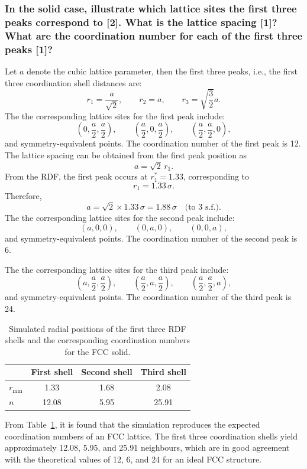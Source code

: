 \documentclass[a4paper,10pt,twocolumn]{article}
\begin{document}
\subsubsection*{In the solid case, illustrate which lattice sites the first three peaks correspond to [2]. What is the lattice spacing [1]? What are the coordination number for each of the first three peaks [1]?}
Let $a$ denote the cubic lattice parameter, then the first three peaks, i.e., the first three coordination shell distances are:
\[
r_1=\frac{a}{\sqrt2},\qquad r_2=a,\qquad r_3=\sqrt{\frac{3}{2}}a.
\]
The the corresponding lattice sites for the first peak include:
\[
\left(0,\frac{a}{2},\frac{a}{2}\right),\qquad \left(\frac{a}{2},0,\frac{a}{2}\right),\qquad \left(\frac{a}{2},\frac{a}{2},0\right),
\]
and symmetry-equivalent points. The coordination number of the first peak is 12. The lattice spacing can be obtained from the first peak position as
\[
a=\sqrt{2}\,r_1 .
\]
From the RDF, the first peak occurs at $r_1^*=1.33$, corresponding to
\[
r_1 = 1.33\,\sigma .
\]
Therefore,
\[
a=\sqrt{2}\times1.33\,\sigma = 1.88\,\sigma \quad \text{(to 3 s.f.)}.
\]
The the corresponding lattice sites for the second peak include:
\[
\left(a,0,0\right),\qquad \left(0,a,0\right),\qquad \left(0,0,a\right),
\]
and symmetry-equivalent points. The coordination number of the second peak is 6.

The the corresponding lattice sites for the third peak include:
\[
\left(a,\frac{a}{2},\frac{a}{2}\right),\qquad
\left(\frac{a}{2},a,\frac{a}{2}\right),\qquad
\left(\frac{a}{2},\frac{a}{2},a\right),
\]
and symmetry-equivalent points. The coordination number of the third peak is 24.

\begin{table}[H]
\centering
\caption{Simulated radial positions of the first three RDF shells and the corresponding coordination numbers for the FCC solid.}
\label{tab:fcc_shells}
\begin{tabular}{lccc}
\toprule
 & First shell & Second shell & Third shell \\
\midrule
$r_{\min}$ & 1.33 & 1.68 & 2.08 \\
$n$ & 12.08 & 5.95 & 25.91 \\
\bottomrule
\end{tabular}
\end{table}

From Table~\ref{tab:fcc_shells}, it is found that the simulation reproduces the expected coordination numbers of an FCC lattice. The first three coordination shells yield approximately 12.08, 5.95, and 25.91 neighbours, which are in good agreement with the theoretical values of 12, 6, and 24 for an ideal FCC structure.
\end{document}
